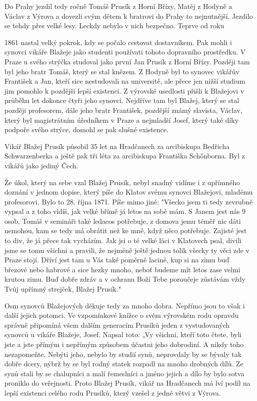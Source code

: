 \documentclass[../dejiny-rodu-prusiku.tex]{subfiles}
\begin{document}
Do Prahy jezdil tedy ročně Tomáš Prusík z Horní Břízy, Matěj z Hodyně a Václav z Výrova a dovezli svým dětem k bratrovi do Prahy to nejnutnější. Jezdilo se tehdy přes velké lesy. Leckdy nebylo v nich bezpečno. Teprve od roku

1861 nastal velký pokrok, kdy se počalo cestovat dostavníkem. Pak mohli i synovci vikáře Blažeje jako studenti používati tohoto dopravního prostředku. V Praze u svého strýčka studoval jako první Jan Prusík z Horní Břízy. Později tam byl jeho bratr Tomáš, kte­rý se stal knězem. Z Hodyně byl to synovec vikářův František a Jan, kteří sice nestudovali na universi­tě, ale přece jen nižší studium jim pomohlo k pozděj­ší lepší existenci. Z výrovské usedlosti přišli k Blažejovi v průběhu let dokonce čtyři jeho synovci. Nejdříve tam byl Blažej, který se stal později profesorem, dále jeho bratr František, pozdější známý slavista, Václav, který byl magistrátním úředníkem v Pra­ze a nejmladší Josef, který také díky podpoře svého strýce, domohl se pak slušné existence.

Vikář Blažej Prusík působil 35 let na Hradčanech za arcibiskupa Bedřicha Schwarzenberka a ještě pak tři léta za arcibiskupa Františka Schőnborna. Byl z vikářů jako jediný Čech.

Že úkol, který na sebe vzal Blažej Prusík, nebyl snadný vidíme i z upřímného doznání v jednom dopise, který píše do Klatov svému synovci Blažejovi, mladému profesorovi. Bylo to 28. října 1871. Píše mimo jiné: "Všecko jsem ti tedy zevrubně vypsal a z toho vidíš, jak velké břímě já letos na sobě mám. S Janem jest nás 9 osob, Tomáš v semináři také ledacos potřebuje, z domova jemu téměř nic dáti nemohou, kam se tedy má obrátit než ke mně, když něco potřebuje. Zajisté jest to div, že já přece tak vycházím. Jak jsi o té velké láci v Klatovech psal, divili jsme se tomu  všichni a pravili, že nejméně ještě jednou tolik všecky ty věci zde v Praze stojí. Dříví jest tam u Vás také poměrně laciné, kup  si na zimu buď březové nebo habrové a sice hezky mnoho, neboť budeme mít letos zase velmi krutou zimu. Buď dobře zdráv a v ochranu Boží Tebe poroučeje zůstávám vždy Tvůj upřímný strejček, Blažej Prusík."

Osm synovců Blažejových děkuje tedy za mnoho dobra. Nepřímo jsou to však i další jejich potomci. Ve vzpomínkové knížce o svém výrovském rodu opravdu správně připomíná všem dalším generacím Prusíků jeden z vystudovaných synovců u vikáře Blažeje, Josef. Napsal toto: „Vy všichni, kteří toto čtete, byli jste a jste přímým i nepřímým způsobem účastni jeho dobrodiní. A nikdy toho nezapomeňte. Nebýti jeho, nebylo by studií synů, neprovdaly by se bývaly tak dobře dcery, nýbrž by se byl rodný statek rozpadl na mnoho drobných dílů. Ze synů stali by se chalupníci a malí řemeslníci a jméno jejich a dílo by bylo sotva proniklo do veřejnosti. Proto Blažej Prusík, vikář na Hradčanech má lví podíl na lepší existenci celého rodu Prusíků, který vzešel z jedné větvi z Výrova.
\end{document}
